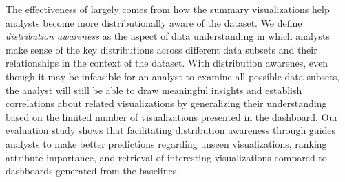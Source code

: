 \par The effectiveness of \sbd largely comes from how the summary visualizations help analysts become more distributionally aware of the dataset. We define \emph{distribution awareness} as the aspect of data understanding in which analysts make sense of the key distributions across different data subsets and their relationships in the context of the dataset. With distribution awarenes, even though it may be infeasible for an analyst to examine all possible data subsets, the analyst will still be able to draw meaningful insights and establish correlations about related visualizations by generalizing their understanding based on the limited number of visualizations presented in the dashboard. Our evaluation study shows that facilitating distribution awareness through \sbd guides analysts to make better predictions regarding unseen visualizations, ranking attribute importance, and retrieval of interesting visualizations compared to dashboards generated from the baselines. %
